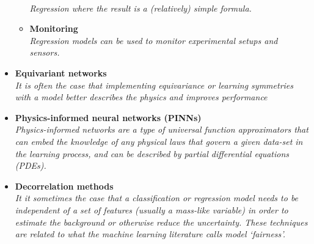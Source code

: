 \documentclass[12pt,letterpaper]{article}
\begin{document}
\begin{itemize}
\begin{itemize}
		\\\textit{Regression where the result is a (relatively) simple formula.}
		\item \textbf{Monitoring}~\cite{Gavrikov:2025tzc,Brinkerhoff:2025rob,AbdusSalam:2024obf,Li:2024akn,Cushman:2024jgi,Shutt:2024che,CMSECAL:2023fvz,Das:2023ktd,Harilal:2023smf,Chen:2023cim,Joshi:2023btt,CMSMuon:2023czf,Matha:2023tmf,Mukund:2023oyy}
		\\\textit{Regression models can be used to monitor experimental setups and sensors.}
	\end{itemize}
\item \textbf{Equivariant networks}~\cite{Nabat:2024nce,Woodward:2024dxb,Brehmer:2024yqw,Maitre:2024hzp,Hendi:2024yin,Cruz:2024grk,Spinner:2024hjm,Bhardwaj:2024wrf,Sahu:2024sts,Bhardwaj:2024djv,Chatterjee:2024pbp,Bressler:2024wzc,Gu:2024lrz,Bright-Thonney:2023gdl,Bogatskiy:2023nnw,Murnane:2023kfm,Lehner:2023prf,Forestano:2023qcy,Buhmann:2023pmh,Aronsson:2023rli,Forestano:2023fpj,Lehner:2023bba,Hao:2022zns,Bogatskiy:2022czk,Favoni:2022mcg,Bogatskiy:2022hub,Shi:2022yqw,Gong:2022lye,Bulusu:2021njs,Favoni:2020reg,Dolan:2020qkr,Kanwar:2003.06413}
\\\textit{It is often the case that implementing equivariance or learning symmetries with a model better describes the physics and improves performance}
\item \textbf{Physics-informed neural networks (PINNs)}~\cite{Bento:2025agw,Hashimoto:2024mdi,Terin:2024iyy,Vatellis:2024vjl,Panahi:2024sfb}
\\\textit{Physics-informed networks are a type of universal function approximators that can embed the knowledge of any physical laws that govern a given data-set in the learning process, and can be described by partial differential equations (PDEs).}
\item \textbf{Decorrelation methods}~\cite{Rothen:2024vro,Algren:2023spv,Rabusov:2022woa,Das:2022cjl,Klein:2022hdv,Mikuni:2021nwn,Dolan:2021pml,Ghosh:2021hrh,Kitouni:2020xgb,Kasieczka:2020pil,clavijo2020adversarial,10.1088/2632-2153/ab9023,Rogozhnikov:2014zea,Wunsch:2019qbo,Englert:2018cfo,Xia:2018kgd,DiscoFever,ATL-PHYS-PUB-2018-014,Bradshaw:2019ipy,Shimmin:2017mfk,Stevens:2013dya,Moult:2017okx,Dolen:2016kst,Louppe:2016ylz}
\\\textit{It it sometimes the case that a classification or regression model needs to be independent of a set of features (usually a mass-like variable) in order to estimate the background or otherwise reduce the uncertainty.  These techniques are related to what the machine learning literature calls model `fairness'.}

\end{itemize}
\end{document}
